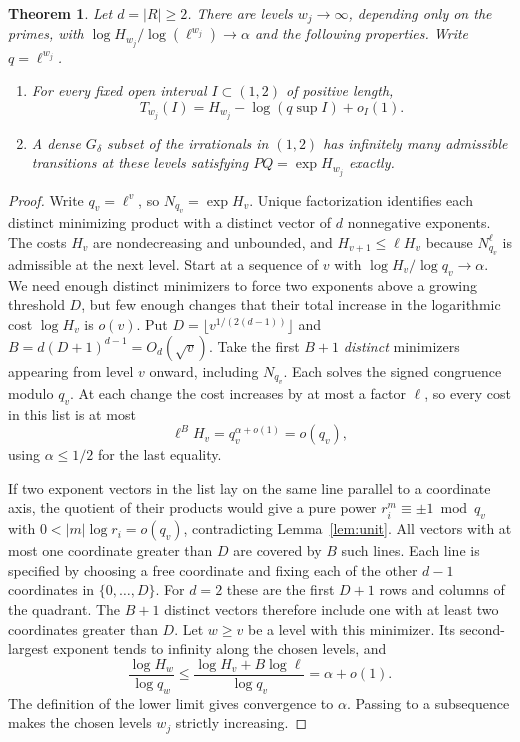 \documentclass[11pt]{article}
\newtheorem{theorem}{Theorem}[section]
\begin{document}
\begin{theorem}\label{th:exact}
Let $d=|R|\ge2$. There are levels $w_j\to\infty$, depending only on
the primes, with $\log H_{w_j}/\log(\ell^{w_j})\to\alpha$ and the
following properties. Write $q=\ell^{w_j}$.
\begin{enumerate}[label=(\roman*),nosep]
\item For every fixed open interval $I\subset(1,2)$ of positive length,
\[
                   T_{w_j}(I)=H_{w_j}-\log(q\sup I)+o_I(1).
\]
\item A dense $G_\delta$ subset of the irrationals in $(1,2)$ has
infinitely many admissible transitions at these levels satisfying
$P Q=\exp H_{w_j}$ exactly.
\end{enumerate}
\end{theorem}
\begin{proof}
Write $q_v=\ell^v$, so $N_{q_v}=\exp H_v$. Unique factorization identifies each distinct
minimizing product with a distinct vector of $d$ nonnegative exponents.
The costs $H_v$ are nondecreasing and unbounded,
and $H_{v+1}\le\ell H_v$ because $N_{q_v}^\ell$ is admissible at the next
level. Start at a sequence of $v$ with $\log H_v/\log q_v\to\alpha$.
We need enough distinct minimizers to force two
exponents above a growing threshold $D$, but few enough changes that
their total increase in the logarithmic cost $\log H_v$ is $o(v)$. Put
$D=\lfloor v^{1/(2(d-1))}\rfloor$ and
$B=d(D+1)^{d-1}=O_d(\sqrt v)$. Take the first
$B+1$ \emph{distinct} minimizers appearing from level $v$ onward,
including $N_{q_v}$. Each solves the signed congruence modulo $q_v$.
At each change the cost increases by at most a factor $\ell$, so every
cost in this list is at most
\[
                  \ell^{B}H_v=q_v^{\alpha+o(1)}=o(q_v),
\]
using $\alpha\le1/2$ for the last equality.

If two exponent vectors in the list lay on the same line parallel to a
coordinate axis, the quotient of their products would give a pure power
$r_i^m\equiv\pm1\bmod q_v$ with $0<|m|\log r_i=o(q_v)$, contradicting
Lemma~\ref{lem:unit}. All vectors with at most one coordinate greater
than $D$ are covered by $B$ such lines. Each line is specified by
choosing a free coordinate and fixing each of the other $d-1$
coordinates in $\{0,\ldots,D\}$.
For $d=2$ these are the first $D+1$ rows and columns of the quadrant.
The $B+1$ distinct vectors therefore include one with at least two
coordinates greater than $D$. Let $w\ge v$ be a level with this
minimizer. Its second-largest exponent tends to infinity along the chosen levels,
and
\[
  \frac{\log H_w}{\log q_w}
          \le \frac{\log H_v+B\log\ell}{\log q_v}
          =\alpha+o(1).
\]
The definition of the lower limit gives convergence to $\alpha$.
Passing to a subsequence makes the chosen levels $w_j$ strictly
increasing.


\end{proof}
\end{document}
